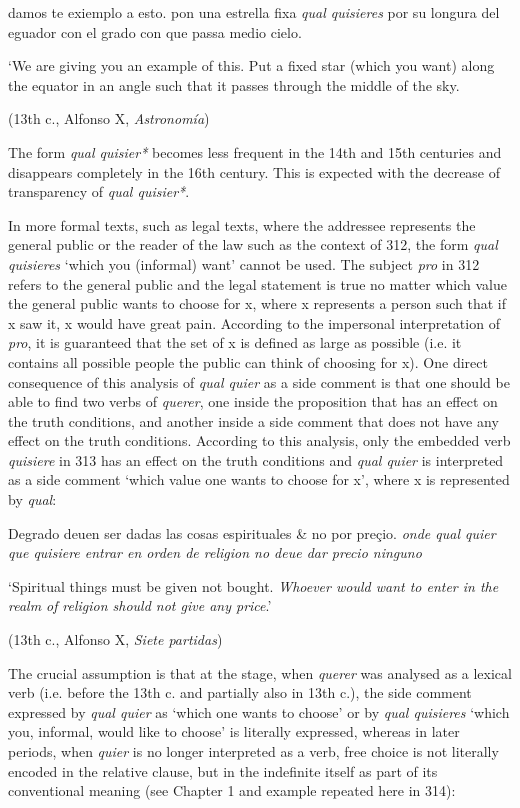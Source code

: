   damos te exiemplo a esto. pon una estrella fixa \textit{qual quisieres} por su longura del eguador con el grado con que passa medio cielo.

  ‘We are giving you an example of this. Put a fixed star (which you want) along the equator in an angle such that it passes through the middle of the sky. 

{  (13th c., Alfonso X,} {\textit{Astronomía}}{)}

The form \textit{qual quisier*} becomes less frequent in the 14th and 15th centuries and disappears completely in the 16th century. This is expected with the decrease of transparency of \textit{qual quisier*}. 

  In more formal texts, such as legal texts, where the addressee represents the general public or the reader of the law such as the context of 312, the form \textit{qual quisieres} ‘which you (informal) want’ cannot be used. The subject \textit{pro} in 312 refers to the general public and the legal statement is true no matter which value the general public wants to choose for x, where x represents a person such that if x saw it, x would have great pain. According to the impersonal interpretation of \textit{pro}, it is guaranteed that the set of x is defined as large as possible (i.e. it contains all possible people the public can think of choosing for x). One direct consequence of this analysis of \textit{qual quier} as a side comment is that one should be able to find two verbs of \textit{querer}, one inside the proposition that has an effect on the truth conditions, and another inside a side comment that does not have any effect on the truth conditions. According to this analysis, only the embedded verb \textit{quisiere} in 313 has an effect on the truth conditions and \textit{qual quier} is interpreted as a side comment ‘which value one wants to choose for x’, where x is represented by \textit{qual}:

  Degrado deuen ser dadas las cosas espirituales \& no por preçio. \textit{onde qual quier que quisiere entrar en orden de religion no deue dar precio ninguno} 

  ‘Spiritual things must be given not bought. \textit{Whoever would want to enter in the realm of} \textit{religion should not give any price}.’

{  (13th c.,}{ }{Alfonso X,} {\textit{Siete partidas}}{)}

The crucial assumption is that at the stage, when \textit{querer} was analysed as a lexical verb (i.e. before the 13th c. and partially also in 13th c.), the side comment expressed by \textit{qual quier} as ‘which one wants to choose’ or by \textit{qual quisieres} ‘which you, informal, would like to choose’ is literally expressed, whereas in later periods, when \textit{quier} is no longer interpreted as a verb, free choice is not literally encoded in the relative clause, but in the indefinite itself as part of its conventional meaning (see Chapter 1 and example  repeated here in 314):

